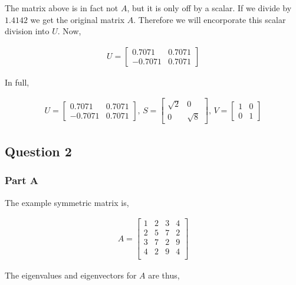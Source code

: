 The matrix above is in fact not \(A\), but it is only off by a scalar. If we divide by \(1.4142\) we get the original matrix \(A\). Therefore we will encorporate this scalar division into \(U\). Now,

\begin{eqnarray}
  U = 
  \begin{bmatrix}
    0.7071 & 0.7071 \\
    -0.7071 & 0.7071
  \end{bmatrix}
\end{eqnarray}

In full,

\begin{eqnarray}
  U = 
  \begin{bmatrix}
    0.7071 & 0.7071 \\
    -0.7071 & 0.7071
  \end{bmatrix}
  \text{, }
  S = 
  \begin{bmatrix}
    \sqrt{2} & 0 \\
    0 & \sqrt{8}
  \end{bmatrix}
  \text{, }
  V = 
  \begin{bmatrix}
    1 & 0 \\
    0 & 1
  \end{bmatrix}
\end{eqnarray}
\newpage
\subsection{Question 2}
\subsubsection{Part A}

The example symmetric matrix is,

\begin{eqnarray}
  A = 
  \begin{bmatrix}
     1 &    2 &    3 &    4 \\
     2 &    5 &    7 &    2 \\
     3 &    7 &    2 &    9 \\
     4 &    2 &    9 &    4 \\    
  \end{bmatrix}
\end{eqnarray}

The eigenvalues and eigenvectors for \(A\) are thus,

